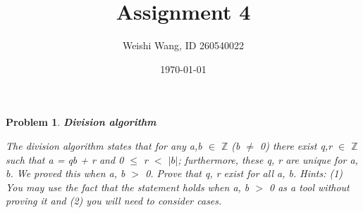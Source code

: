 \documentclass{article}
\newtheorem{problem}{Problem}
\theoremstyle{definition}
\begin{document}
 \title{Assignment 4} 

\author{Weishi Wang, ID 260540022} 

\date{\today}

\maketitle

\begin{problem} 
\textbf{Division algorithm}

The division algorithm states that for any a,b \(\in\) \(\mathbb{Z}\) (b \(\neq\) 0) there exist q,r \(\in\) \(\mathbb{Z}\) such that a = qb + r and 0 \(\leq\) r \(<\) \(|b|\); furthermore, these q, r are unique for a, b. We proved this when a, b \(>\) 0. Prove that q, r exist for all a, b. Hints: (1) You may use the fact that the statement holds when a, b \(>\) 0 as a tool without proving it and (2) you will need to consider cases.\\\\
\end{problem}
\end{document}
